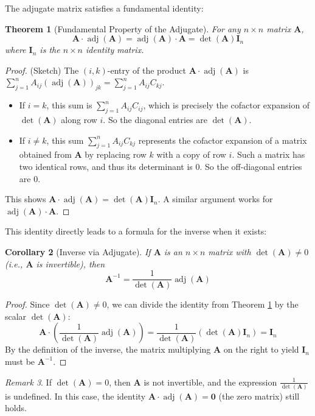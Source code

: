 \documentclass[11pt]{article}
\newtheorem{theorem}{Theorem}[section]
\newtheorem{corollary}[theorem]{Corollary}
\theoremstyle{definition}
\theoremstyle{remark}
\newtheorem{remark}[theorem]{Remark}
\DeclareMathOperator{\adj}{adj}
\newcommand{\mat}[1]{\mathbf{#1}} %
\begin{document}
The adjugate matrix satisfies a fundamental identity:

\begin{theorem}[Fundamental Property of the Adjugate] \label{thm:adj_identity}
For any $n \times n$ matrix $\mat{A}$,
\[ \mat{A} \cdot \adj(\mat{A}) = \adj(\mat{A}) \cdot \mat{A} = \det(\mat{A}) \mat{I}_n \]
where $\mat{I}_n$ is the $n \times n$ identity matrix.
\end{theorem}

\begin{proof} (Sketch)
The $(i,k)$-entry of the product $\mat{A} \cdot \adj(\mat{A})$ is $\sum_{j=1}^n A_{ij} (\adj(\mat{A}))_{jk} = \sum_{j=1}^n A_{ij} C_{kj}$.
\begin{itemize}
    \item If $i=k$, this sum is $\sum_{j=1}^n A_{ij} C_{ij}$, which is precisely the cofactor expansion of $\det(\mat{A})$ along row $i$. So the diagonal entries are $\det(\mat{A})$.
    \item If $i \neq k$, this sum $\sum_{j=1}^n A_{ij} C_{kj}$ represents the cofactor expansion of a matrix obtained from $\mat{A}$ by replacing row $k$ with a copy of row $i$. Such a matrix has two identical rows, and thus its determinant is 0. So the off-diagonal entries are 0.
\end{itemize}
This shows $\mat{A} \cdot \adj(\mat{A}) = \det(\mat{A}) \mat{I}_n$. A similar argument works for $\adj(\mat{A}) \cdot \mat{A}$.
\end{proof}

This identity directly leads to a formula for the inverse when it exists:

\begin{corollary}[Inverse via Adjugate]
If $\mat{A}$ is an $n \times n$ matrix with $\det(\mat{A}) \neq 0$ (i.e., $\mat{A}$ is invertible), then
\[ \mat{A}^{-1} = \frac{1}{\det(\mat{A})} \adj(\mat{A}) \]
\end{corollary}

\begin{proof}
Since $\det(\mat{A}) \neq 0$, we can divide the identity from Theorem \ref{thm:adj_identity} by the scalar $\det(\mat{A})$:
\[ \mat{A} \cdot \left( \frac{1}{\det(\mat{A})} \adj(\mat{A}) \right) = \frac{1}{\det(\mat{A})} (\det(\mat{A}) \mat{I}_n) = \mat{I}_n \]
By the definition of the inverse, the matrix multiplying $\mat{A}$ on the right to yield $\mat{I}_n$ must be $\mat{A}^{-1}$.
\end{proof}

\begin{remark}
If $\det(\mat{A}) = 0$, then $\mat{A}$ is not invertible, and the expression $\frac{1}{\det(\mat{A})}$ is undefined. In this case, the identity $\mat{A} \cdot \adj(\mat{A}) = \mat{0}$ (the zero matrix) still holds.
\end{remark}
\end{document}
